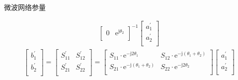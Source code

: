 \begin{frame}{微波网络参量}
\begin{enumerate}
\begin{align*}
\begin{bmatrix*}
                0 & \mathrm{e}^{\mathrm{j}\theta_2} \\
            \end{bmatrix*}^{-1}
            \begin{bmatrix*}
                a_1^{'} \\
                a_2^{'} \\
            \end{bmatrix*}
        \end{align*}
        \begin{align*}
            \begin{bmatrix*}
                b_1^{'} \\
                b_2^{'} \\
            \end{bmatrix*}
            =
            \begin{bmatrix*}
                S_{11}^{'} & S_{12}^{'} \\
                S_{21}^{'} & S_{22}^{'} \\
            \end{bmatrix*}
            =
            \begin{bmatrix*}
                S_{11}\cdot\mathrm{e}^{-\mathrm{j}2\theta_1} & S_{12}\cdot\mathrm{e}^{-\mathrm{j}(\theta_1+\theta_2)} \\
                S_{21}\cdot\mathrm{e}^{-\mathrm{j}(\theta_1+\theta_2)} & S_{22}\cdot \mathrm{e}^{-\mathrm{j}2\theta_2} \\
            \end{bmatrix*}
            \begin{bmatrix*}
                a_1^{'} \\
                a_2^{'} \\
            \end{bmatrix*}
        \end{align*}
    \end{enumerate}
\end{frame}

